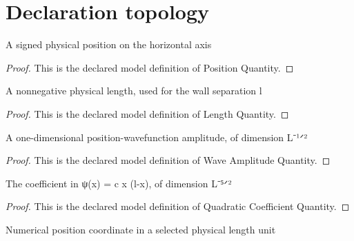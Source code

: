 \section{Declaration topology}
\begin{definition}
  \label{def:physics:phyx-mini-0550:phyxminiproblems-problemphyxmini0550-positionquantity}
  A signed physical position on the horizontal axis
\end{definition}
\begin{proof}
  This is the declared model definition of Position Quantity.
\end{proof}
\begin{definition}
  \label{def:physics:phyx-mini-0550:phyxminiproblems-problemphyxmini0550-lengthquantity}
  A nonnegative physical length, used for the wall separation l
\end{definition}
\begin{proof}
  This is the declared model definition of Length Quantity.
\end{proof}
\begin{definition}
  \label{def:physics:phyx-mini-0550:phyxminiproblems-problemphyxmini0550-waveamplitudequantity}
  A one-dimensional position-wavefunction amplitude, of dimension L⁻¹ᐟ²
\end{definition}
\begin{proof}
  This is the declared model definition of Wave Amplitude Quantity.
\end{proof}
\begin{definition}
  \label{def:physics:phyx-mini-0550:phyxminiproblems-problemphyxmini0550-quadraticcoefficientquantity}
  The coefficient in ψ(x) = c x (l-x), of dimension L⁻⁵ᐟ²
\end{definition}
\begin{proof}
  This is the declared model definition of Quadratic Coefficient Quantity.
\end{proof}
\begin{definition}
  \label{def:physics:phyx-mini-0550:phyxminiproblems-problemphyxmini0550-positionreadout}
  Numerical position coordinate in a selected physical length unit
\end{definition}
